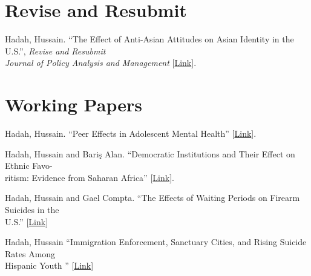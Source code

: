 \documentclass[letterpaper]{article}
\renewenvironment{itemize}{
  \begin{list}{}{
    \setlength{\leftmargin}{1.5em}
  }
}{
  \end{list}
}
\begin{document}
\section*{Revise and Resubmit}
\vspace{2 mm}
\begin{itemize}
  \item Hadah, Hussain. ``The Effect of Anti-Asian Attitudes on Asian Identity in the U.S.'', \textit{Revise and Resubmit} \\{\makebox[4mm]{\hfill}} \textit{Journal of Policy Analysis and Management} [\href{https://hhadah.github.io/asian-identity-attrition/my_paper/submit_preprint.pdf}{Link}]. 
\end{itemize}
\vspace{2 mm}
\section*{Working Papers}
\vspace{2 mm}
\begin{itemize}
  \item Hadah, Hussain. ``Peer Effects in Adolescent Mental Health'' [\href{https://hhadah.github.io/Depression_Idea/my_paper/Hadah-Peer-Effect-Depression.pdf}{Link}].
  \item Hadah, Hussain and Bariş Alan\student. ``Democratic Institutions and Their Effect on Ethnic Favo-\\{\makebox[4mm]{\hfill}} ritism: Evidence from Saharan Africa'' [\href{https://dx.doi.org/10.2139/ssrn.4566225}{Link}].
  \item Hadah, Hussain and Gael Compta\student. ``The Effects of Waiting Periods on Firearm Suicides in the \\{\makebox[4mm]{\hfill}} U.S.'' [\href{https://dx.doi.org/10.2139/ssrn.5383500}{Link}]
\studentnote
  \item Hadah, Hussain ``Immigration Enforcement, Sanctuary Cities, and Rising Suicide Rates Among\\{\makebox[4mm]{\hfill}}Hispanic Youth '' [\href{https://hhadah.github.io/sc-and-hispanic-children-suicide/my_paper/sc_and_hispanic_children_suicide.pdf}{Link}]
\end{itemize}
\vspace{2 mm}
\end{document}
